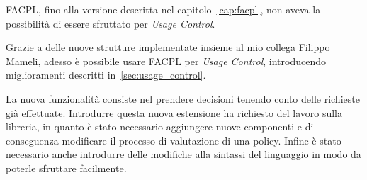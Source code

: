 \label{cap:usagecontrolfacpl}
FACPL, fino alla versione descritta nel capitolo~\ref{cap:facpl}, non aveva la possibilità
di essere sfruttato per \textit{Usage Control}.\\ \par
Grazie a delle nuove strutture implementate insieme al mio collega Filippo Mameli, adesso è possibile
usare FACPL per \textit{Usage Control}, introducendo miglioramenti descritti in~\ref{sec:usage_control}.\\ \par
La nuova funzionalità consiste nel prendere decisioni tenendo conto delle richieste già effettuate.
Introdurre questa nuova estensione ha richiesto del lavoro sulla libreria, in quanto è stato necessario aggiungere
nuove componenti e di conseguenza modificare il processo di valutazione di una policy.
Infine è stato necessario anche introdurre delle modifiche alla sintassi del linguaggio in modo da poterle sfruttare 
facilmente.

